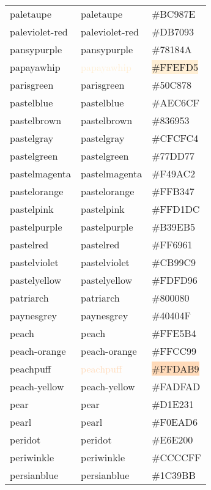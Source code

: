 \documentclass[
]{article}
\begin{document}
\begin{longtable}[]{@{}lll@{}}
paletaupe & \textcolor{paletaupe}{paletaupe} &
\colorbox{paletaupe}{\#BC987E}\tabularnewline
paleviolet-red & \textcolor{paleviolet-red}{paleviolet-red} &
\colorbox{palered-violet}{\#DB7093}\tabularnewline
pansypurple & \textcolor{pansypurple}{pansypurple} &
\colorbox{pansypurple}{\#78184A}\tabularnewline
papayawhip & \textcolor{papayawhip}{papayawhip} &
\colorbox{papayawhip}{\#FFEFD5}\tabularnewline
parisgreen & \textcolor{parisgreen}{parisgreen} &
\colorbox{emerald}{\#50C878}\tabularnewline
pastelblue & \textcolor{pastelblue}{pastelblue} &
\colorbox{pastelblue}{\#AEC6CF}\tabularnewline
pastelbrown & \textcolor{pastelbrown}{pastelbrown} &
\colorbox{pastelbrown}{\#836953}\tabularnewline
pastelgray & \textcolor{pastelgray}{pastelgray} &
\colorbox{pastelgray}{\#CFCFC4}\tabularnewline
pastelgreen & \textcolor{pastelgreen}{pastelgreen} &
\colorbox{pastelgreen}{\#77DD77}\tabularnewline
pastelmagenta & \textcolor{pastelmagenta}{pastelmagenta} &
\colorbox{pastelmagenta}{\#F49AC2}\tabularnewline
pastelorange & \textcolor{pastelorange}{pastelorange} &
\colorbox{pastelorange}{\#FFB347}\tabularnewline
pastelpink & \textcolor{pastelpink}{pastelpink} &
\colorbox{pastelpink}{\#FFD1DC}\tabularnewline
pastelpurple & \textcolor{pastelpurple}{pastelpurple} &
\colorbox{pastelpurple}{\#B39EB5}\tabularnewline
pastelred & \textcolor{pastelred}{pastelred} &
\colorbox{pastelred}{\#FF6961}\tabularnewline
pastelviolet & \textcolor{pastelviolet}{pastelviolet} &
\colorbox{pastelviolet}{\#CB99C9}\tabularnewline
pastelyellow & \textcolor{pastelyellow}{pastelyellow} &
\colorbox{pastelyellow}{\#FDFD96}\tabularnewline
patriarch & \textcolor{patriarch}{patriarch} &
\colorbox{patriarch}{\#800080}\tabularnewline
paynesgrey & \textcolor{paynesgrey}{paynesgrey} &
\colorbox{paynesgrey}{\#40404F}\tabularnewline
peach & \textcolor{peach}{peach} &
\colorbox{peach}{\#FFE5B4}\tabularnewline
peach-orange & \textcolor{peach-orange}{peach-orange} &
\colorbox{peach-orange}{\#FFCC99}\tabularnewline
peachpuff & \textcolor{peachpuff}{peachpuff} &
\colorbox{peachpuff}{\#FFDAB9}\tabularnewline
peach-yellow & \textcolor{peach-yellow}{peach-yellow} &
\colorbox{peach-yellow}{\#FADFAD}\tabularnewline
pear & \textcolor{pear}{pear} & \colorbox{pear}{\#D1E231}\tabularnewline
pearl & \textcolor{pearl}{pearl} &
\colorbox{eggshell}{\#F0EAD6}\tabularnewline
peridot & \textcolor{peridot}{peridot} &
\colorbox{peridot}{\#E6E200}\tabularnewline
periwinkle & \textcolor{periwinkle}{periwinkle} &
\colorbox{lavenderblue}{\#CCCCFF}\tabularnewline
persianblue & \textcolor{persianblue}{persianblue} &
\colorbox{persianblue}{\#1C39BB}\tabularnewline

\end{longtable}
\end{document}
